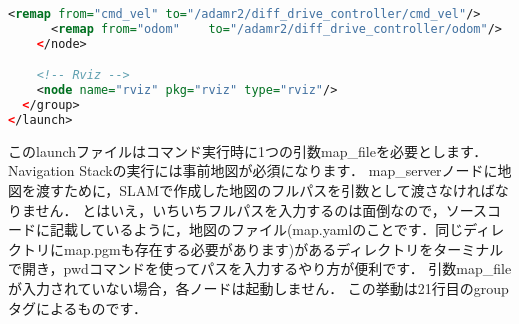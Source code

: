 \documentclass[{../../master}]{subfiles}
\begin{document}
\begin{lstlisting}[language=XML, label=code:adamr2_navigation_launch, caption=\textsf{adamr2\_navigation.launch}]
      <remap from="cmd_vel" to="/adamr2/diff_drive_controller/cmd_vel"/>
      <remap from="odom"    to="/adamr2/diff_drive_controller/odom"/>
    </node>

    <!-- Rviz -->
    <node name="rviz" pkg="rviz" type="rviz"/>
  </group>
</launch>
\end{lstlisting}

このlaunchファイルはコマンド実行時に1つの引数\textsf{map\_file}を必要とします．
Navigation Stackの実行には事前地図が必須になります．
\textsf{map\_server}ノードに地図を渡すために，SLAMで作成した地図のフルパスを引数として渡さなければなりません．
とはいえ，いちいちフルパスを入力するのは面倒なので，ソースコードに記載しているように，地図のファイル(\textsf{map.yaml}のことです．同じディレクトリに\textsf{map.pgm}も存在する必要があります)があるディレクトリをターミナルで開き，\textsf{pwd}コマンドを使ってパスを入力するやり方が便利です．
引数\textsf{map\_file}が入力されていない場合，各ノードは起動しません．
この挙動は21行目の\textsf{group}タグによるものです．
\end{document}
